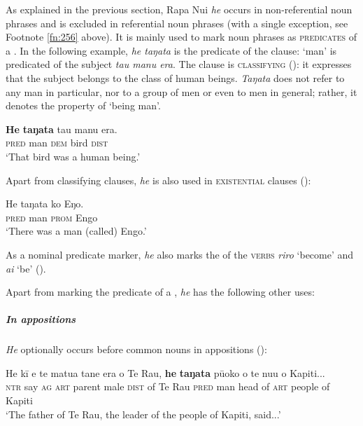 As explained in the previous section, Rapa Nui \textit{he} occurs in non-referential noun phrases and is excluded in referential noun phrases (with a single exception, see Footnote \ref{fn:256} above). It is mainly used to mark noun phrases as \textsc{predicates} of a . In the following example, \textit{he taŋata} is the predicate of the clause: ‘man’ is predicated of the subject \textit{tau manu era}. The clause is \textsc{classifying} (): it expresses that the subject belongs to the class of human beings. \textit{Taŋata} does not refer to any man in particular, nor to a group of men or even to men in general; rather, it denotes the property of ‘being man’.

\ea\label{ex:5.42}
\gll \textbf{He} \textbf{taŋata} tau manu era. \\
\textsc{pred} man \textsc{dem} bird \textsc{dist} \\

\glt
‘That bird was a human being.’ \textstyleExampleref{[Mtx-7-12.069]}
\z

Apart from classifying clauses, \textit{he} is also used in \textsc{existential} clauses ():

\ea\label{ex:5.43}
\gll He taŋata ko Eŋo. \\
\textsc{pred} man \textsc{prom} Engo \\

\glt
‘There was a man (called) Engo.’ \textstyleExampleref{[Mtx-7-28.001]}
\z

As a nominal predicate marker, \textit{he} also marks the  of the \textsc{ verbs} \textit{riro} ‘become’ and \textit{ai} ‘be’ ().

Apart from marking the predicate of a , \textit{he} has the following other uses:

\subparagraph{In appositions} \textit{He} optionally occurs before common nouns in appositions ():

\ea\label{ex:5.44}
\gll He kī e te matu{\ꞌ}a tane era o Te Rau, \textbf{he} \textbf{taŋata} pū{\ꞌ}oko  o te nu{\ꞌ}u o Kapiti...\\
\textsc{ntr} say \textsc{ag} \textsc{art} parent male \textsc{dist} of Te Rau \textsc{pred} man head  of \textsc{art} people of Kapiti\\

\glt 
‘The father of Te Rau, the leader of the people of Kapiti, said...’ \textstyleExampleref{[R347.089]} 
\z

